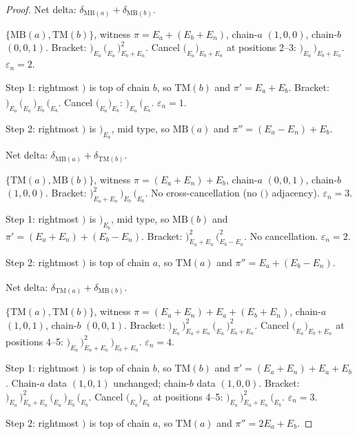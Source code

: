 \documentclass[11pt]{article}
\theoremstyle{definition}
\theoremstyle{remark}
\newcommand{\MB}{\mathrm{MB}}
\newcommand{\TM}{\mathrm{TM}}
\newcommand{\labr}[1]{{)}_{#1}}
\newcommand{\labl}[1]{{(}_{#1}}
\begin{document}
\begin{proof}
Net delta: $\delta_{\MB(a)} + \delta_{\MB(b)}$.

\smallskip
\noindent$\{\MB(a), \TM(b)\}$, witness $\pi = E_a + (E_b + E_n)$, chain-$a$ $(1, 0, 0)$,
chain-$b$ $(0, 0, 1)$. Bracket: $\labr{E_a}\, \labl{E_a}\, \labr{E_b + E_n}^{2}$.
Cancel $\labl{E_a}\labr{E_b + E_n}$ at positions 2--3: $\labr{E_a}\, \labr{E_b + E_n}$.
$\varepsilon_n = 2$.

Step 1: rightmost $\labr{}$ is top of chain $b$, so $\TM(b)$ and
$\pi' = E_a + E_b$. Bracket: $\labr{E_a}\, \labl{E_a}\, \labr{E_b}\, \labl{E_b}$.
Cancel $\labl{E_a}\labr{E_b}$: $\labr{E_a}\, \labl{E_b}$. $\varepsilon_n = 1$.

Step 2: rightmost $\labr{}$ is $\labr{E_a}$, mid type, so $\MB(a)$ and
$\pi'' = (E_a - E_n) + E_b$.

Net delta: $\delta_{\MB(a)} + \delta_{\TM(b)}$.

\smallskip
\noindent$\{\TM(a), \MB(b)\}$, witness $\pi = (E_a + E_n) + E_b$, chain-$a$ $(0, 0, 1)$,
chain-$b$ $(1, 0, 0)$. Bracket: $\labr{E_a + E_n}^{2}\, \labr{E_b}\, \labl{E_b}$.
No cross-cancellation (no $\labl{}\labr{}$ adjacency). $\varepsilon_n = 3$.

Step 1: rightmost $\labr{}$ is $\labr{E_b}$, mid type, so $\MB(b)$ and
$\pi' = (E_a + E_n) + (E_b - E_n)$. Bracket: $\labr{E_a + E_n}^{2}\, \labl{E_b - E_n}^{2}$.
No cancellation. $\varepsilon_n = 2$.

Step 2: rightmost $\labr{}$ is top of chain $a$, so $\TM(a)$ and $\pi'' = E_a + (E_b - E_n)$.

Net delta: $\delta_{\TM(a)} + \delta_{\MB(b)}$.

\smallskip
\noindent$\{\TM(a), \TM(b)\}$, witness $\pi = (E_a + E_n) + E_a + (E_b + E_n)$,
chain-$a$ $(1, 0, 1)$, chain-$b$ $(0, 0, 1)$. Bracket:
$\labr{E_a}\, \labr{E_a + E_n}^{2}\, \labl{E_a}\, \labr{E_b + E_n}^{2}$. Cancel
$\labl{E_a}\labr{E_b + E_n}$ at positions 4--5:
$\labr{E_a}\, \labr{E_a + E_n}^{2}\, \labr{E_b + E_n}$. $\varepsilon_n = 4$.

Step 1: rightmost $\labr{}$ is top of chain $b$, so $\TM(b)$ and
$\pi' = (E_a + E_n) + E_a + E_b$. Chain-$a$ data $(1, 0, 1)$ unchanged; chain-$b$
data $(1, 0, 0)$. Bracket: $\labr{E_a}\, \labr{E_a + E_n}^{2}\, \labl{E_a}\,
\labr{E_b}\, \labl{E_b}$. Cancel $\labl{E_a}\labr{E_b}$ at positions 4--5:
$\labr{E_a}\, \labr{E_a + E_n}^{2}\, \labl{E_b}$. $\varepsilon_n = 3$.

Step 2: rightmost $\labr{}$ is top of chain $a$, so $\TM(a)$ and $\pi'' = 2 E_a + E_b$.


\end{proof}
\end{document}
